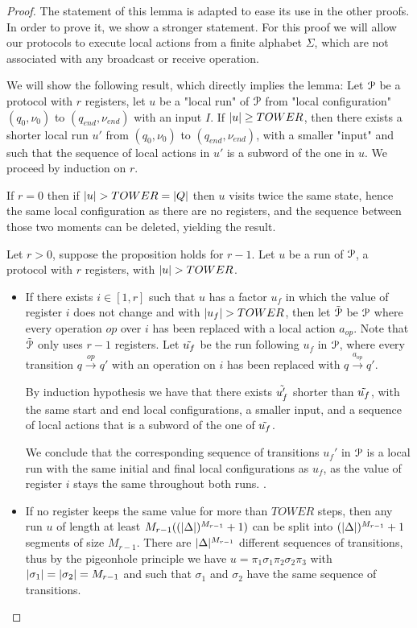 \begin{proof}
	The statement of this lemma is adapted to ease its use in the other proofs.
	In order to prove it, we show a stronger statement.	
	For this proof we will allow our protocols to execute local actions from a finite alphabet $\Sigma$, which are not associated with any broadcast or receive operation.	
	
	We will show the following result, which directly implies the lemma:
	Let $\mathcal{P}$ be a protocol with $r$ registers, let $u$ be a "local run" of $\mathcal{P}$ from "local configuration" $(q_0, \nu_0)$ to $(q_{end}, \nu_{end})$ with an input $I$. If $|u| \geq TOWER$, then there exists a shorter local run $u'$ from $(q_0, \nu_0)$ to $(q_{end}, \nu_{end})$, with a smaller "input" and such that the sequence of local actions in $u'$ is a subword of the one in $u$.
	We proceed by induction on $r$.
	
	If $r=0$ then if $|u| > TOWER = |Q|$ then $u$ visits twice the same state, hence the same local configuration as there are no registers, and the sequence between those two moments can be deleted, yielding the result.
	
	Let $r>0$, suppose the proposition holds for $r-1$.
	Let $u$ be a run of $\mathcal{P}$, a protocol with $r$ registers, with $|u| > TOWER$.
	
	\begin{itemize}
		\item If there exists $i \in [1,r]$ such that $u$ has a factor $u_f$ in which the value of register $i$ does not change and with $|u_f| > TOWER$, then let $\Tilde{\mathcal{P}}$ be $\mathcal{P}$ where every operation $op$ over $i$ has been replaced with a local action $a_{op}$. Note that $\Tilde{\mathcal{P}}$ only uses $r-1$ registers. 
		Let $\Tilde{u_f}$ be the run following $u_f$ in $\mathcal{P}$, where every transition $q \xrightarrow{op} q'$ with an operation on $i$ has been replaced with $q \xrightarrow{a_{op}} q'$.
		
		By induction hypothesis we have that there exists $\Tilde{u'_f}$ shorter than $\Tilde{u_f}$, with the same start and end local configurations, a smaller input, and a sequence of local actions that is a subword of the one of $\Tilde{u_f}$.
		
		We conclude that the corresponding sequence of transitions $u_f'$ in $\mathcal{P}$ is a local run with the same initial and final local configurations as $u_f$, as the value of register $i$ stays the same throughout both runs. .
		
		\item If no register keeps the same value for more than $TOWER$ steps, then any run $u$ of length at least $M_{r-1} ((|\Delta|)^{M_{r-1}} +1)$ can be split into $(|\Delta|)^{M_{r-1}} +1$ segments of size $M_{r-1}$. There are $|\Delta|^{M_{r-1}}$ different sequences of transitions, thus by the pigeonhole principle we have $u = \pi_1 \sigma_1 \pi_2 \sigma_2 \pi_3$ with $|\sigma_1| = |\sigma_2| = M_{r-1}$ and such that  $\sigma_1$ and $\sigma_2$ have the same sequence of transitions.
		

\end{itemize}
\end{proof}

